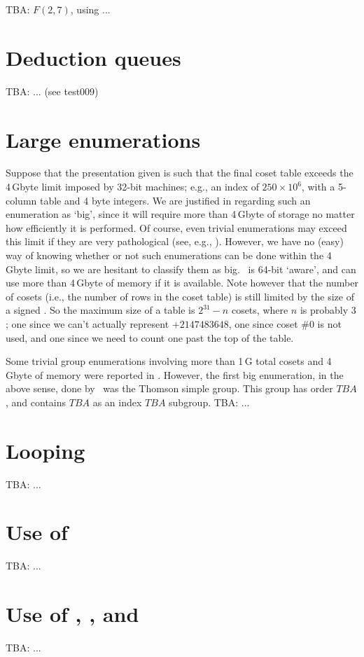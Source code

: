 TBA: $F(2,7)$, using  \amp {} ...

\section{Deduction queues}

TBA: ... (see test009)

\section{Large enumerations}

Suppose that the presentation given is such that the final coset table
  exceeds the 4\,Gbyte limit imposed by 32-bit machines; e.g., an index of
  $250 \times 10^6$\kern-2pt, with a 5-column table and 4 byte integers.
We are justified in regarding such an enumeration as `big'\kern-1.5pt, 
  since it will require more than 4\,Gbyte of storage no matter how
  efficiently it is performed.
Of course, even trivial enumerations may exceed this limit if they are
  very pathological (see, e.g., \cite{HR2}).
However, we have no (easy) way of knowing whether or not such enumerations
  can be done within the 4\,Gbyte limit, so we are hesitant to classify
  them as big.
\ace\ is 64-bit `aware'\kern-1.5pt, and can use more than 4\,Gbyte of
  memory if it is available.
Note however that the number of cosets (i.e., the number of rows in the
  coset table) is still limited by the size of a signed .
So the maximum size of a table is $2^{31} - n$ cosets, where $n$ is
  probably $3$; one since we can't actually represent $+2147483648$, one
  since coset \#0 is not used, and one since we need to count one past the
  top of the table.

Some trivial group enumerations involving more than 1\,G total cosets 
  and 4\,Gbyte of memory were reported in \cite{HR2}.
However, the first big enumeration, in the above sense, done by \ace\ was
  the Thomson simple group.
This group has order $TBA$, and contains $TBA$ as an index $TBA$ subgroup.
TBA: ...

\section{Looping}

TBA: ...

\section{Use of }\label{ex007}

TBA: ...

\section{Use of , ,  and } 

TBA: ...


